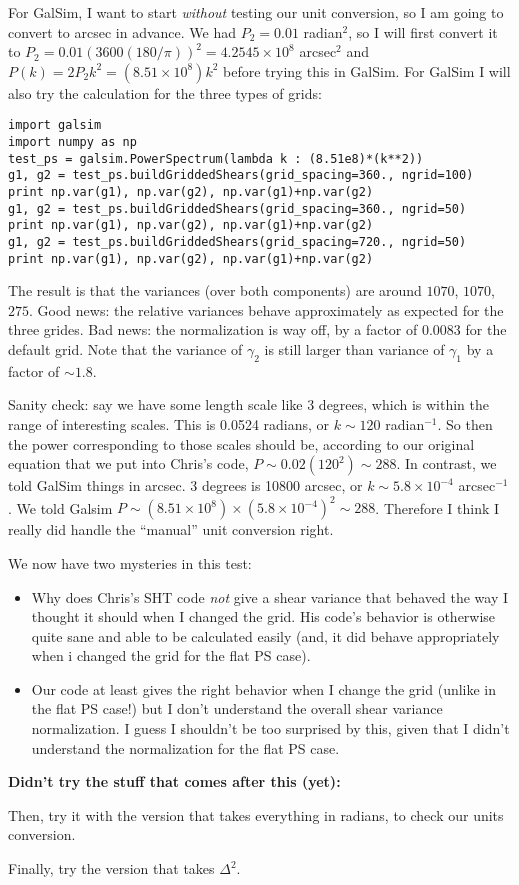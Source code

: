 \documentclass[preprint]{aastex}
\begin{document}
For GalSim, I want to start {\em without} testing our unit conversion,
so I am going to convert to arcsec in advance.  We had $P_2=0.01$
radian$^2$, so I will first convert it to
$P_2=0.01 (3600(180/\pi))^2=4.2545\times 10^8$ arcsec$^2$ and $P(k)=2
P_2 k^2 = (8.51\times 10^{8}) k^2$ before trying this in
GalSim.  For GalSim I will also try the calculation for the three
types of grids:
\begin{verbatim}
import galsim
import numpy as np
test_ps = galsim.PowerSpectrum(lambda k : (8.51e8)*(k**2))
g1, g2 = test_ps.buildGriddedShears(grid_spacing=360., ngrid=100)
print np.var(g1), np.var(g2), np.var(g1)+np.var(g2)
g1, g2 = test_ps.buildGriddedShears(grid_spacing=360., ngrid=50)
print np.var(g1), np.var(g2), np.var(g1)+np.var(g2)
g1, g2 = test_ps.buildGriddedShears(grid_spacing=720., ngrid=50)
print np.var(g1), np.var(g2), np.var(g1)+np.var(g2)
\end{verbatim}
The result is that the variances (over both components) are around
$1070$, $1070$, $275$.  Good news: the relative variances behave
approximately as expected for the three grides.  Bad news: the
normalization is way off, by a factor of $0.0083$ for the default
grid.  Note that the variance of $\gamma_2$ is still larger than
variance of $\gamma_1$ by a factor of $\sim 1.8$.

Sanity check: say we have some length scale like 3 degrees, which is
within the range of interesting scales.  This is 0.0524 radians, or
$k\sim120$ radian$^{-1}$.  So
then the power corresponding to those scales should be, according to
our original equation that we put into Chris's code, $P\sim
0.02(120^2)\sim 288$.  In contrast, we told GalSim things in arcsec.
3 degrees is 10800 arcsec, or $k\sim 5.8\times 10^{-4}$ arcsec$^{-1}$.
We told Galsim $P\sim (8.51\times 10^8)\times (5.8\times
10^{-4})^2\sim 288$.  Therefore I think I really did handle the
``manual'' unit conversion right.

We now have two mysteries in this test:
\begin{itemize}
\item Why does Chris's SHT code {\em not} give a shear variance that
  behaved the way I thought it should when I changed the grid.  His
  code's behavior is otherwise quite sane and able to be calculated
  easily (and, it did behave appropriately when i changed the grid for
  the flat PS case).
\item Our code at least gives the right behavior when I change the
  grid (unlike in the flat PS case!) but I don't understand the
  overall shear variance normalization.  I guess I shouldn't be too
  surprised by this, given that I didn't understand the normalization
  for the flat PS case.
\end{itemize}

\textbf{Didn't try the stuff that comes after this (yet):}

Then, try it with the version that takes everything in radians, to
check our units conversion.

Finally, try the version that takes $\Delta^2$.
\end{document}
